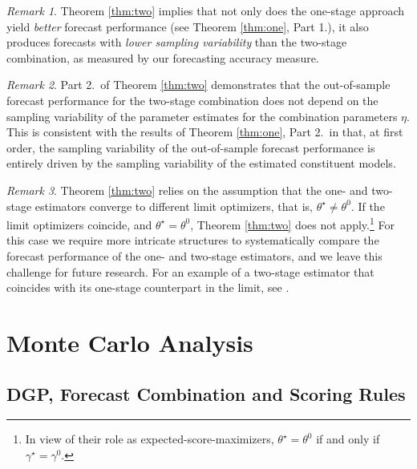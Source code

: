 \documentclass[12pt]{article}
\theoremstyle{definition}
\theoremstyle{remark}
\newtheorem{remark}{Remark}
\begin{document}
\begin{remark}
\label{rmk:rateofconvergence} Theorem \ref{thm:two} implies that not only does the one-stage approach yield \textit{better} forecast performance (see Theorem \ref{thm:one}, Part 1.), it also produces forecasts with \textit{lower sampling variability} than the two-stage combination, as measured by our forecasting accuracy measure.
\end{remark}

\begin{remark}
Part 2.\ of Theorem \ref{thm:two} demonstrates that the out-of-sample forecast performance for the two-stage combination does not depend on the sampling variability of the parameter estimates for the combination parameters $\eta $. This is consistent with the results of Theorem \ref{thm:one}, Part 2.\ in that, at first order, the sampling variability of the out-of-sample forecast performance is entirely driven by the sampling variability of the estimated constituent models.
\end{remark}

\begin{remark}
\label{rmk:derivassump} Theorem \ref{thm:two} relies on the assumption that the one- and two-stage estimators converge to different limit optimizers, that is, $\theta^{\star} \neq \theta^0$. If the limit optimizers coincide, and $\theta^{\star} = \theta^0$, Theorem \ref{thm:two} does not apply.\footnote{In view of their role as expected-score-maximizers, $\theta^{\star} = \theta^0$ if and only if $\gamma^{\star} = \gamma^0$.} For this case we require more intricate structures to systematically compare the forecast performance of the one- and two-stage estimators, and we leave this challenge for future research. For an example of a two-stage estimator that coincides with its one-stage counterpart in the limit, see \citet[sec. 2]{Pagan1986}.
\end{remark}

\section{Monte Carlo Analysis\label{sec:montecarlo}}

\subsection{DGP, Forecast Combination and Scoring Rules\label{subsec:montecarlodgp}}
\end{document}
